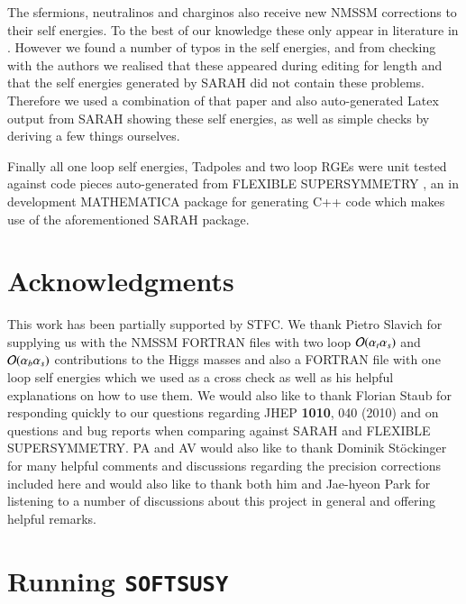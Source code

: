 \documentclass[final,3p,times,pdflatex]{elsarticle}
\def\SOFTSUSY{{\tt SOFTSUSY}}
\def\at{\alpha_t}
\def\ab{\alpha_b}
\def\as{\alpha_s}
\def\oatas{{\cal O}(\at\as)}
\def\oabas{{\cal O}(\ab\as)}
\begin{document}
The sfermions, neutralinos and charginos also receive new NMSSM
corrections to their self energies. To the best of our knowledge these
only appear in literature in \cite{Staub:2010ty}.  However we found a
number of typos in the self energies, and from checking with the
authors we realised that these appeared during editing for length and
that the self energies generated by SARAH
\cite{Staub:2009bi,Staub:2010jh,Staub:2012pb,Staub:2013tta} did not
contain these problems.  Therefore we used a combination of that paper
and also auto-generated Latex output from SARAH showing these self
energies, as well as simple checks by deriving a few things ourselves.

Finally all one loop self energies, Tadpoles and two loop RGEs were unit tested against code pieces auto-generated from FLEXIBLE SUPERSYMMETRY \cite{flexi-susy}, an in development MATHEMATICA package for generating C++ code which makes use of the aforementioned SARAH package\cite{Staub:2009bi,Staub:2010jh,Staub:2012pb,Staub:2013tta}. 


\section*{Acknowledgments}
This work has been partially supported by STFC\@. We thank Pietro
Slavich for supplying us with the NMSSM FORTRAN files with two loop
$\oatas$ and $\oabas$ contributions to the Higgs masses and also a
FORTRAN file with one loop self energies which we used as a cross
check as well as his helpful explanations on how to use them. We would
also like to thank Florian Staub for responding quickly to our questions
regarding JHEP {\bf 1010}, 040 (2010) and on questions and bug reports
when comparing against SARAH and FLEXIBLE SUPERSYMMETRY. PA and AV
would also like to thank Dominik St\"ockinger for many helpful
comments and discussions regarding the precision corrections included
here and would also like to thank both him and Jae-hyeon Park for
listening to a number of discussions about this project in general and
offering helpful remarks.


\appendix

\section{Running \SOFTSUSY}
\label{sec:run}
\end{document}
